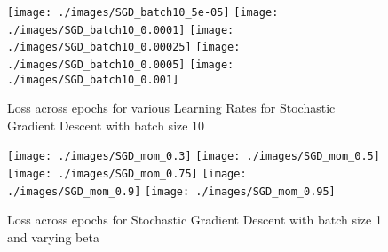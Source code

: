 \documentclass{article}
\begin{document}
\begin{figure}
\centering
\texttt{[image: ./images/SGD\_batch10\_5e-05]}
\texttt{[image: ./images/SGD\_batch10\_0.0001]}
\texttt{[image: ./images/SGD\_batch10\_0.00025]}
\texttt{[image: ./images/SGD\_batch10\_0.0005]}
\texttt{[image: ./images/SGD\_batch10\_0.001]}
\caption{Loss across epochs for various Learning Rates for Stochastic Gradient Descent with batch size 10}
\end{figure}

\begin{figure}
\centering
\texttt{[image: ./images/SGD\_mom\_0.3]}
\texttt{[image: ./images/SGD\_mom\_0.5]}
\texttt{[image: ./images/SGD\_mom\_0.75]}
\texttt{[image: ./images/SGD\_mom\_0.9]}
\texttt{[image: ./images/SGD\_mom\_0.95]}
\caption{Loss across epochs for Stochastic Gradient Descent with batch size 1 and varying beta}
\end{figure}
\end{document}
